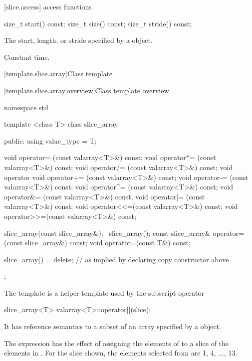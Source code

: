 [slice.access]{ access functions}
%
%
%
\begin{itemdecl}
size_t start() const;
size_t size() const;
size_t stride() const;
\end{itemdecl}

\begin{itemdescr}
\pnum
\returns The start, length, or stride specified
by a  object.

\pnum
\complexity Constant time.
\end{itemdescr}

[template.slice.array]{Class template }

[template.slice.array.overview]{Class template  overview}

%
\begin{codeblock}
namespace std {
  template <class T> class slice_array {
  public:
    using value_type = T;

    void operator=  (const valarray<T>&) const;
    void operator*= (const valarray<T>&) const;
    void operator/= (const valarray<T>&) const;
    void operator%
    void operator+= (const valarray<T>&) const;
    void operator-= (const valarray<T>&) const;
    void operator^= (const valarray<T>&) const;
    void operator&= (const valarray<T>&) const;
    void operator|= (const valarray<T>&) const;
    void operator<<=(const valarray<T>&) const;
    void operator>>=(const valarray<T>&) const;

    slice_array(const slice_array&);
    ~slice_array();
    const slice_array& operator=(const slice_array&) const;
    void operator=(const T&) const;

    slice_array() = delete;       // as implied by declaring copy constructor above
  };
}
\end{codeblock}

\pnum
The
template is a helper template used by the
subscript operator

\begin{codeblock}
slice_array<T> valarray<T>::operator[](slice);
\end{codeblock}

It has reference semantics to a subset of an array specified by a
object.

\pnum
\begin{example}
The expression
has the effect of assigning the elements of
to a slice of the elements in
.
For the slice shown, the elements
selected from
are 1, 4, ..., 13.
\end{example}

